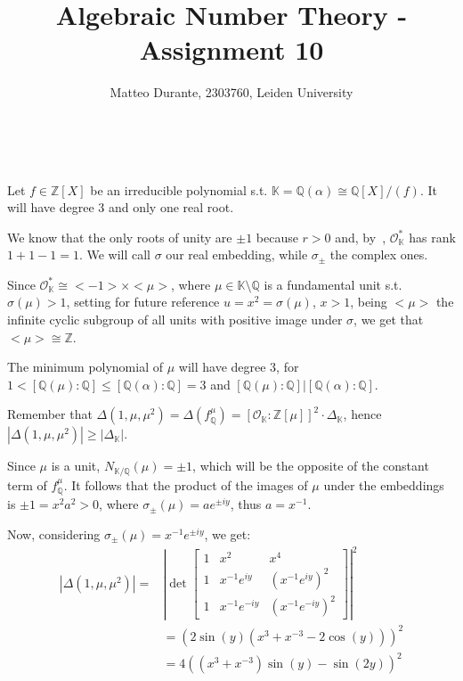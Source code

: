 \documentclass{article}
\newcommand{\numberset}{\mathbb}
\newcommand{\Z}{\numberset{Z}}
\newcommand{\Q}{\numberset{Q}}
\newcommand{\K}{\numberset{K}}
\newcommand{\exercise}[1]{\noindent {\bf Exercise #1}}
\begin{document}
\title{Algebraic Number Theory - Assignment 10}

\author{Matteo Durante, 2303760, Leiden University}

\maketitle

~\\
\exercise{21}

Let $f\in\Z[X]$ be an irreducible polynomial s.t. $\K=\Q(\alpha)\cong\Q[X]/(f)$. It will have degree 3 and only one real root.

We know that the only roots of unity are $\pm 1$ because $r>0$ and, by~\cite[thm. 5.13]{stev}, $\mathcal{O}^*_{\K}$ has rank $1+1-1=1$. We will call $\sigma$ our real embedding, while $\sigma_{\pm}$ the complex ones.

Since $\mathcal{O}^*_{\K}\cong<-1>\times<\mu>$, where $\mu\in\K\setminus\Q$ is a fundamental unit s.t. $\sigma(\mu)>1$, setting for future reference $u=x^2=\sigma(\mu)$, $x>1$, being $<\mu>$ the infinite cyclic subgroup of all units with positive image under $\sigma$, we get that $<\mu>\cong\Z$.

The minimum polynomial of $\mu$ will have degree 3, for $1<[\Q(\mu):\Q]\leq [\Q(\alpha):\Q]=3$ and $[\Q(\mu):\Q]|[\Q(\alpha):\Q]$.

Remember that $\Delta(1,\mu,\mu^2)=\Delta(f^{\mu}_{\Q})=[\mathcal{O}_{\K}:\Z[\mu]]^2\cdot\Delta_{\K}$, hence $|\Delta(1,\mu,\mu^2)|\geq|\Delta_{\K}|$.

Since $\mu$ is a unit, $N_{\K/\Q}(\mu)=\pm 1$, which will be the opposite of the constant term of $f^{\mu}_{\Q}$. It follows that the product of the images of $\mu$ under the embeddings is $\pm 1=x^2a^2>0$, where $\sigma_{\pm}(\mu)=ae^{\pm iy}$, thus $a=x^{-1}$.

Now, considering $\sigma_{\pm}(\mu)=x^{-1}e^{\pm iy}$, we get:
\begin{align*}
  |\Delta(1,\mu,\mu^2)|= &\left|\det\begin{bmatrix}
    1 & x^2 & x^4 \\
    1 & x^{-1}e^{iy} & (x^{-1}e^{iy})^2 \\
    1 & x^{-1}e^{-iy} & (x^{-1}e^{-iy})^2
  \end{bmatrix}\right|^2 \\
  & =(2\sin(y)(x^3+x^{-3}-2\cos(y)))^2 \\
  & =4((x^3+x^{-3})\sin(y)-\sin(2y))^2
\end{align*}
\end{document}
